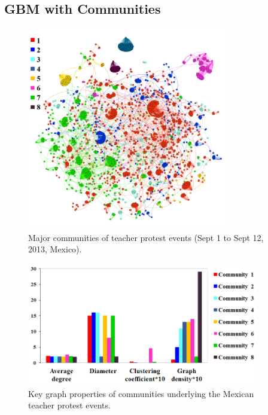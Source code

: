 \subsection{GBM with Communities}
\begin{figure}[t]
\centering
\includegraphics[width=3.5in] {figures/4_teacher_major_community.png}
\caption{Major communities of teacher protest events (Sept 1 to Sept 12, 2013,
Mexico).}
\label{fig:teacher_major_community}
\end{figure}


\begin{figure}[t]
\centering
\includegraphics[width=4in] {figures/4teacher-community-parameters.png}
\caption{Key graph properties of communities underlying the Mexican teacher protest events.}
\label{fig:teacher_community_parameters0}
\end{figure}

